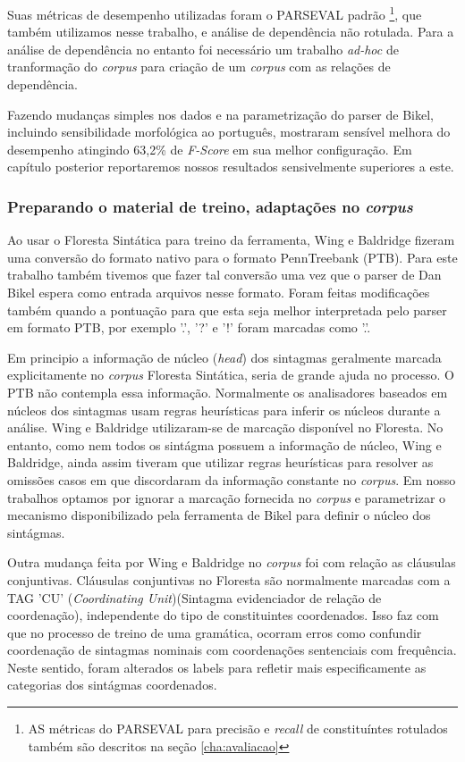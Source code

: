 Suas métricas de desempenho utilizadas foram o PARSEVAL padrão \footnote{AS métricas do PARSEVAL para precisão e \emph{recall} de constituíntes rotulados também são descritos na seção \ref{cha:avaliacao}}, que também utilizamos nesse trabalho, e análise de dependência não rotulada. Para a análise de dependência no entanto foi necessário um trabalho \emph{ad-hoc} de tranformação do \emph{corpus} para criação de um \emph{corpus} com as relações de dependência.

Fazendo mudanças simples nos dados e na parametrização do parser de Bikel, incluindo sensibilidade morfológica ao português, mostraram sensível melhora do desempenho atingindo 63,2{\%} de \emph{F-Score} em sua melhor configuração. Em capítulo posterior reportaremos nossos resultados sensivelmente superiores a este.


\subsubsection{Preparando o material de treino, adaptações no \emph{corpus}} %
\label{sec:wing_baldridge_adapt_corpus}

Ao usar o Floresta Sintática para treino da ferramenta, Wing e Baldridge fizeram uma conversão do formato nativo para o formato PennTreebank (PTB). Para este trabalho também tivemos que fazer tal conversão uma vez que o parser de Dan Bikel espera como entrada arquivos nesse formato. Foram feitas modificações também quando a pontuação para que esta seja melhor interpretada pelo parser em formato PTB, por exemplo '.', '?' e '!' foram marcadas como '.'. 

Em principio a informação de núcleo (\emph{head}) dos sintagmas geralmente marcada explicitamente no \emph{corpus} Floresta Sintática, seria de grande ajuda no processo. O PTB não contempla essa informação. Normalmente os analisadores baseados em núcleos dos sintagmas usam regras heurísticas para inferir os núcleos durante a análise. Wing e Baldridge utilizaram-se de marcação disponível no Floresta. No entanto, como nem todos os sintágma possuem a informação de núcleo, Wing e Baldridge, ainda assim tiveram que utilizar regras heurísticas para resolver as omissões casos em que discordaram da informação constante no \emph{corpus}. Em nosso trabalhos optamos por ignorar a marcação fornecida no \emph{corpus} e parametrizar o mecanismo disponibilizado pela ferramenta de Bikel para definir o núcleo dos sintágmas.

Outra mudança feita por Wing e Baldridge no \emph{corpus} foi com relação as cláusulas conjuntivas. Cláusulas conjuntivas no Floresta são normalmente marcadas com a TAG 'CU' (\emph{Coordinating Unit})(Sintagma evidenciador de relação de coordenação), independente do tipo de constituintes coordenados. Isso faz com que no processo de treino de uma gramática, ocorram erros como confundir coordenação de sintagmas nominais com coordenações sentenciais com frequência. Neste sentido, foram alterados os labels para refletir mais especificamente as categorias dos sintágmas coordenados.

